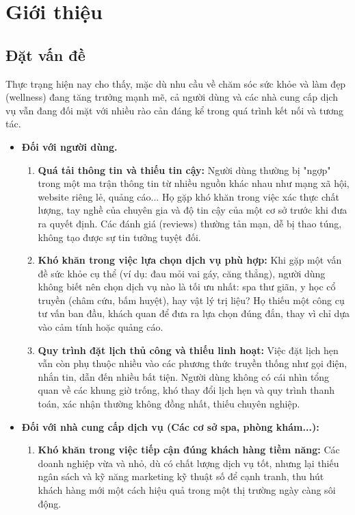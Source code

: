 \chapter{Giới thiệu}
\section{Đặt vấn đề}
Thực trạng hiện nay cho thấy, mặc dù nhu cầu về chăm sóc sức khỏe và làm đẹp (wellness) đang tăng trưởng mạnh mẽ, cả người dùng và các nhà cung cấp dịch vụ vẫn đang đối mặt với nhiều rào cản đáng kể trong quá trình kết nối và tương tác.
\begin{itemize}
  \item \textbf{Đối với người dùng.}
    \begin{enumerate}
        \item \textbf{Quá tải thông tin và thiếu tin cậy:} Người dùng thường bị "ngợp" trong một ma trận thông tin từ nhiều nguồn khác nhau như mạng xã hội, website riêng lẻ, quảng cáo... Họ gặp khó khăn trong việc xác thực chất lượng, tay nghề của chuyên gia và độ tin cậy của một cơ sở trước khi đưa ra quyết định. Các đánh giá (reviews) thường tản mạn, dễ bị thao túng, không tạo được sự tin tưởng tuyệt đối.
        \item \textbf{Khó khăn trong việc lựa chọn dịch vụ phù hợp:}  Khi gặp một vấn đề sức khỏe cụ thể (ví dụ: đau mỏi vai gáy, căng thẳng), người dùng không biết nên chọn dịch vụ nào là tối ưu nhất: spa thư giãn, y học cổ truyền (châm cứu, bấm huyệt), hay vật lý trị liệu? Họ thiếu một công cụ tư vấn ban đầu, khách quan để đưa ra lựa chọn đúng đắn, thay vì chỉ dựa vào cảm tính hoặc quảng cáo.
        \item \textbf{Quy trình đặt lịch thủ công và thiếu linh hoạt:} Việc đặt lịch hẹn vẫn còn phụ thuộc nhiều vào các phương thức truyền thống như gọi điện, nhắn tin, dẫn đến nhiều bất tiện. Người dùng không có cái nhìn tổng quan về các khung giờ trống, khó thay đổi lịch hẹn và quy trình thanh toán, xác nhận thường không đồng nhất, thiếu chuyên nghiệp.
    \end{enumerate}
  \item \textbf{Đối với nhà cung cấp dịch vụ (Các cơ sở spa, phòng khám...):
}
    \begin{enumerate}
        \item \textbf{Khó khăn trong việc tiếp cận đúng khách hàng tiềm năng:} Các doanh nghiệp vừa và nhỏ, dù có chất lượng dịch vụ tốt, nhưng lại thiếu ngân sách và kỹ năng marketing kỹ thuật số để cạnh tranh, thu hút khách hàng mới một cách hiệu quả trong một thị trường ngày càng sôi động.

\end{enumerate}
\end{itemize}
